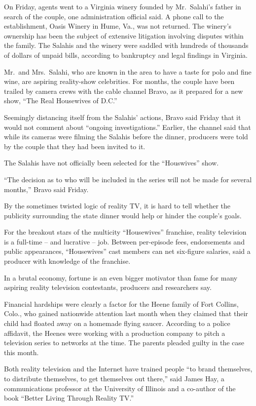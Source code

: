 ﻿\documentclass[12pt]{article}
\begin{document}
On Friday, agents went to a Virginia winery founded by Mr.~Salahi's father in search of the couple,
one administration official said. A phone call to the establishment, Oasis Winery in Hume, Va., was
not returned. The winery's ownership has been the subject of extensive litigation involving disputes
within the family. The Salahis and the winery were saddled with hundreds of thousands of dollars of
unpaid bills, according to bankruptcy and legal findings in Virginia.

Mr.~and Mrs.~Salahi, who are known in the area to have a taste for polo and fine wine, are aspiring
reality-show celebrities. For months, the couple have been trailed by camera crews with the cable
channel Bravo, as it prepared for a new show, ``The Real Housewives of D.C.''

Seemingly distancing itself from the Salahis' actions, Bravo said Friday that it would not comment
about ``ongoing investigations.'' Earlier, the channel said that while its cameras were filming the
Salahis before the dinner, producers were told by the couple that they had been invited to it.

The Salahis have not officially been selected for the ``Houswives'' show.

``The decision as to who will be included in the series will not be made for several months,'' Bravo
said Friday.

By the sometimes twisted logic of reality TV, it is hard to tell whether the publicity surrounding
the state dinner would help or hinder the couple's goals.

For the breakout stars of the multicity ``Housewives'' franchise, reality television is a full-time
-- and lucrative -- job. Between per-episode fees, endorsements and public appearances,
``Housewives'' cast members can net six-figure salaries, said a producer with knowledge of the
franchise.

In a brutal economy, fortune is an even bigger motivator than fame for many aspiring reality
television contestants, producers and researchers say.

Financial hardships were clearly a factor for the Heene family of Fort Collins, Colo., who gained
nationwide attention last month when they claimed that their child had floated away on a homemade
flying saucer. According to a police affidavit, the Heenes were working with a production company to
pitch a television series to networks at the time. The parents pleaded guilty in the case this
month.

Both reality television and the Internet have trained people ``to brand themselves, to distribute
themselves, to get themselves out there,'' said James Hay, a communications professor at the
University of Illinois and a co-author of the book ``Better Living Through Reality TV.''
\end{document}
